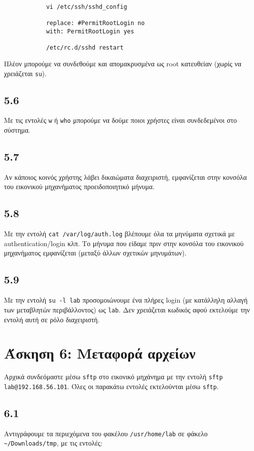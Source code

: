 \documentclass[a4paper, 12pt]{article}
\begin{document}
		\begin{verbatim}
			vi /etc/ssh/sshd_config
			
			replace: #PermitRootLogin no 
			with: PermitRootLogin yes
			
			/etc/rc.d/sshd restart
		\end{verbatim}
		
		Πλέον μπορούμε να συνδεθούμε και απομακρυσμένα ως root κατευθείαν (χωρίς να χρειάζεται \verb|su|).

	\subsection*{5.6}
		Με τις εντολές \verb|w| ή \verb|who| μπορούμε να δούμε ποιοι χρήστες είναι συνδεδεμένοι στο σύστημα.

	\subsection*{5.7}
		Αν κάποιος κοινός χρήστης λάβει δικαιώματα διαχειριστή, εμφανίζεται στην κονσόλα του εικονικού μηχανήματος προειδοποιητικό μήνυμα. 

	\subsection*{5.8}
		Με την εντολή \verb|cat /var/log/auth.log| βλέπουμε όλα τα μηνύματα σχετικά με authentication/login κλπ. Το μήνυμα που είδαμε πριν στην κονσόλα του εικονικού μηχανήματος εμφανίζεται (μεταξύ άλλων σχετικών μηνυμάτων).

	\subsection*{5.9}
		Με την εντολή \verb|su -l lab| προσομοιώνουμε ένα πλήρες login (με κατάλληλη αλλαγή των μεταβλητών περιβάλλοντος) ως \verb|lab|. Δεν χρειάζεται κωδικός αφού εκτελούμε την εντολή αυτή σε ρόλο διαχειριστή.

\section*{Άσκηση 6: Μεταφορά αρχείων}

	Αρχικά συνδεόμαστε μέσω \verb|sftp| στο εικονικό μηχάνημα με την εντολή \verb|sftp lab@192.168.56.101|.
	Όλες οι παρακάτω εντολές εκτελούνται μέσω \verb|sftp|.
	
	\subsection*{6.1}
		Αντιγράφουμε τα περιεχόμενα του φακέλου \verb|/usr/home/lab| σε φάκελο \verb|~/Downloads/tmp|, με τις εντολές:
		
\end{document}
